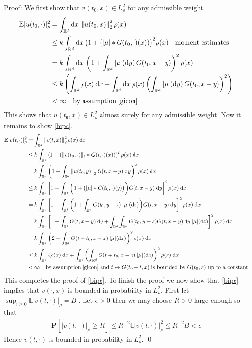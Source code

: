 \documentclass{article}
\numberwithin{equation}{section}
\newcommand{\R}{\mathbb{R}}
\newcommand{\E}{\mathbb{E}}
\newcommand{\Norm}[1]{\left\|  #1   \right\|}
\newcommand{\ud}{\ensuremath{\mathrm{d}}}
\begin{document}
Proof: We first show that $u(t_0,x)\in L^2_\rho$ for any admissible weight.
\begin{align*}
\E |u(t_0,\cdot)|_\rho^2 &= \int_{\R^d}\ud x \: \Norm{u(t_0,x)}_2^2\rho(x)
\\& \le k  \int_{\R^d}\ud x \: \big(1+(|\mu|*G(t_0,\cdot)(x))\big)^2\rho(x) \quad \text{moment estimates}
\\& = k \int_{\R^d}\ud x \: \left(1+\int_{\R^d}|\mu|(\ud y)\: G(t_0,x-y)\right)^2\rho(x)
\\& \le k  \left(\int_{\R^d} \rho(x) \: \ud x+\int_{\R^d}\ud x \: \rho(x)\left(\int_{\R^d}|\mu|(\ud y)\: G(t_0,x-y)\right)^2\right)
\\& < \infty \quad \text{by assumption \ref{gicon}}
\end{align*}
This shows that $u(t_0,x)\in L^2_\rho$ almost surely for any admissible weight. Now it remains to show \eqref{bipc}. 
\begin{align*}
\E |v(t,\cdot)|_\rho^2 &= \int_{\R^d}\Norm{v(t,x)}_2^2\rho(x) \: \ud x
\\& \le k \int_{\R^d} \left( 1+\left( \Norm{u(t_0,\cdot)}_2 * G(t,\cdot)(x) \right) \right)^2\rho(x) \: \ud x 
\\& = k \int_{\R^d} \left( 1+\int_{\R^d}  \Norm{u(t_0,y)}_2G(t,x-y) \: \ud y \right)^2\rho(x) \: \ud x 
\\& \le k \int_{\R^d} \left[1+\int_{\R^d}  \bigg(1+\big(|\mu|*G(t_0,\cdot)(y)\big)\bigg)G(t,x-y) \: \ud y \right]^2\rho(x) \: \ud x 
\\& = k \int_{\R^d} \left[1+\int_{\R^d}  \bigg(1+\int_{\R^d}G(t_0,y-z) \: |\mu| (\ud z)\bigg)G(t,x-y) \: \ud y \right]^2\rho(x) \: \ud x 
\\&=  k \int_{\R^d} \left[1+\int_{\R^d}  G(t,x-y) \: \ud y +\int_{\R^d}\int_{\R^d}G(t_0,y-z) G(t,x-y) \: \ud y \: |\mu| (\ud z)  \right]^2\rho(x) \: \ud x
\\&=  k \int_{\R^d} \left(2 +\int_{\R^d} G(t+t_0,x-z) \: |\mu| (\ud z)  \right)^2\rho(x) \: \ud x
\\& \le  k \int_{\R^d} 4 \rho(x) \: \ud x +\int_{\R^d}\left(\int_{\R^d} G(t+t_0,x-z) \: |\mu| (\ud z)  \right)^2\rho(x) \: \ud x
\\ & < \infty \quad \text{by assumption \ref{gicon} and $t \mapsto G(t_0+t,x)$ is bounded by $G(t_0,x)$ up to a constant}
\end{align*}
This completes the proof of \eqref{bipc}. To finish the proof we now show that \eqref{bipc} implies that $v(\cdot,x)$ is bounded in probability in $L^2_\rho$. First let $\sup_{t\ge 0} \E |v(t,\cdot)|_\rho = B$ . Let $\epsilon >0$ then we may choose $R>0$ large enough so that 
\begin{align*}
\textbf{P}[|v(t,\cdot)|_\rho \ge R] \le R^{-2}\E |v(t,\cdot)|_\rho^2 \le R^{-2}B < \epsilon
\end{align*}  
Hence $v(t,\cdot)$ is bounded in probability in $L^2_{\rho}$. \qed 
\end{document}
